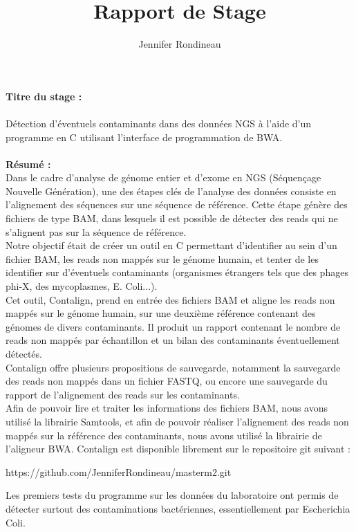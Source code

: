 \documentclass[a4paper,12pt]{article}
\title{Rapport de Stage}
\author{Jennifer Rondineau}
\begin{document}
 

\textbf{Titre du stage :} \\\\
Détection d'éventuels contaminants dans des données NGS à l'aide d'un programme en C utilisant l'interface de programmation de BWA. \\
\\
\textbf{Résumé :} \\

Dans le cadre d'analyse de génome entier et d'exome en NGS (Séquençage Nouvelle Génération), une des étapes clés de l'analyse des données consiste en l'alignement des séquences sur une séquence de référence. Cette étape génère des fichiers de type BAM, dans lesquels il est possible de détecter des reads qui ne s'alignent pas sur la séquence de référence. \\
Notre objectif était de créer un outil en C permettant d'identifier au sein d'un fichier BAM, les reads non mappés sur le génome humain, et tenter de les identifier sur d'éventuels contaminants (organismes étrangers tels que des phages phi-X, des mycoplasmes, E. Coli...). \\
Cet outil, Contalign, prend en entrée des fichiers BAM et aligne les reads non mappés sur le génome humain, sur une deuxième référence contenant des génomes de divers contaminants. Il produit un rapport contenant le nombre de reads non mappés par échantillon et un bilan des contaminants éventuellement détectés. \\
Contalign offre plusieurs propositions de sauvegarde, notamment la sauvegarde des reads non mappés dans un fichier FASTQ, ou encore une sauvegarde du rapport de l'alignement des reads sur les contaminants.\\
Afin de pouvoir lire et traiter les informations des fichiers BAM, nous avons utilisé la librairie Samtools, et afin de pouvoir réaliser l'alignement des reads non mappés sur la référence des contaminants, nous avons utilisé la librairie de l'aligneur BWA. Contalign est disponible librement sur le repositoire git suivant : \begin{center} https://github.com/JenniferRondineau/masterm2.git \end{center}
Les premiers tests du programme sur les données du laboratoire ont permis de détecter surtout des contaminations bactériennes, essentiellement par  Escherichia Coli.\\\\
\end{document}
